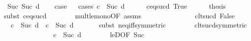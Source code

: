 \begin{isabellebody}
\ Suc{\isacharcolon}{\kern0pt}\ {\isacharparenleft}{\kern0pt}Suc\ d{\isacharparenright}{\kern0pt}\isanewline
\isanewline
\ \ \isamarkupfalse%
\ {\isacharquery}{\kern0pt}case\isanewline
\ \ \isamarkupfalse%
{\isacharparenleft}{\kern0pt}cases\ {\isachardoublequoteopen}c\ {\isacharequal}{\kern0pt}\ Suc\ d{\isachardoublequoteclose}{\isacharparenright}{\kern0pt}\isanewline
\ \ \ \ \isamarkupfalse%
\ c{\isacharunderscore}{\kern0pt}eq{\isacharunderscore}{\kern0pt}sucd{\isacharcolon}{\kern0pt}\ True\isanewline
\ \ \ \ \isamarkupfalse%
\ {\isacharquery}{\kern0pt}thesis\isanewline
\ \ \ \ \ \ \isamarkupfalse%
{\isacharparenleft}{\kern0pt}subst\ c{\isacharunderscore}{\kern0pt}eq{\isacharunderscore}{\kern0pt}sucd{\isacharparenright}{\kern0pt}\isanewline
\ \ \ \ \ \ \isamarkupfalse%
\ mult{\isacharunderscore}{\kern0pt}le{\isacharunderscore}{\kern0pt}mono{}{\isacharbrackleft}{\kern0pt}OF\ assms{\isacharparenleft}{\kern0pt}{}{\isacharparenright}{\kern0pt}{\isacharbrackright}{\kern0pt}\isanewline
\ \ \ \ \ \ \isacommand{{\isachardot}{\kern0pt}}\isamarkupfalse%
\isanewline
\isanewline
\ \ \isamarkupfalse%
\isanewline
\ \ \ \ \isamarkupfalse%
\ c{\isacharunderscore}{\kern0pt}lt{\isacharunderscore}{\kern0pt}sucd{\isacharcolon}{\kern0pt}\ False\isanewline
\isanewline
\ \ \ \ \isamarkupfalse%
\ {}{\isacharcolon}{\kern0pt}\ {\isachardoublequoteopen}c\ {\isachargreater}{\kern0pt}\ Suc\ d\ {\isasymor}\ c\ {\isacharless}{\kern0pt}\ Suc\ d{\isachardoublequoteclose}\isanewline
\ \ \ \ \ \ \isamarkupfalse%
{\isacharparenleft}{\kern0pt}subst\ neq{\isacharunderscore}{\kern0pt}iff{\isacharbrackleft}{\kern0pt}symmetric{\isacharbrackright}{\kern0pt}{\isacharparenright}{\kern0pt}\isanewline
\ \ \ \ \ \ \isamarkupfalse%
\ c{\isacharunderscore}{\kern0pt}lt{\isacharunderscore}{\kern0pt}sucd{\isacharbrackleft}{\kern0pt}symmetric{\isacharbrackright}{\kern0pt}\isanewline
\ \ \ \ \ \ \isacommand{{\isachardot}{\kern0pt}}\isamarkupfalse%
\isanewline
\ \ \ \ \isamarkupfalse%
\ {}{\isacharcolon}{\kern0pt}\ {\isachardoublequoteopen}{\isasymnot}\ c\ {\isachargreater}{\kern0pt}\ Suc\ d{\isachardoublequoteclose}\isanewline
\ \ \ \ \ \ \isamarkupfalse%
\ leD{\isacharbrackleft}{\kern0pt}OF\ Suc{\isacharparenleft}{\kern0pt}{}{\isacharparenright}{\kern0pt}{\isacharbrackright}{\kern0pt}\isanewline
\ \ \ \ \ \ \isacommand{{\isachardot}{\kern0pt}}\isamarkupfalse%

\end{isabellebody}
